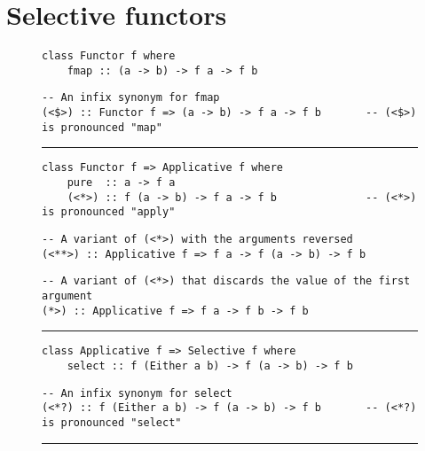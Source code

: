 \section{Selective functors}\label{sec-selective}

\begin{figure}
\begin{verbatim}
class Functor f where
    fmap :: (a -> b) -> f a -> f b
\end{verbatim}
\vspace{0.5mm}
\begin{verbatim}
-- An infix synonym for fmap
(<$>) :: Functor f => (a -> b) -> f a -> f b       -- (<$>) is pronounced "map"
\end{verbatim}
\vspace{2mm}
\hrule
\vspace{2mm}
\begin{verbatim}
class Functor f => Applicative f where
    pure  :: a -> f a
    (<*>) :: f (a -> b) -> f a -> f b              -- (<*>) is pronounced "apply"
\end{verbatim}
\vspace{0.5mm}
\begin{verbatim}
-- A variant of (<*>) with the arguments reversed
(<**>) :: Applicative f => f a -> f (a -> b) -> f b
\end{verbatim}
\vspace{0.5mm}
\begin{verbatim}
-- A variant of (<*>) that discards the value of the first argument
(*>) :: Applicative f => f a -> f b -> f b
\end{verbatim}
\vspace{2mm}
\hrule
\vspace{2mm}
\begin{verbatim}
class Applicative f => Selective f where
    select :: f (Either a b) -> f (a -> b) -> f b
\end{verbatim}
\vspace{0.5mm}
\begin{verbatim}
-- An infix synonym for select
(<*?) :: f (Either a b) -> f (a -> b) -> f b       -- (<*?) is pronounced "select"
\end{verbatim}
\vspace{2mm}
\hrule
\vspace{2mm}
\begin{verbatim}

\end{verbatim}
\end{figure}
